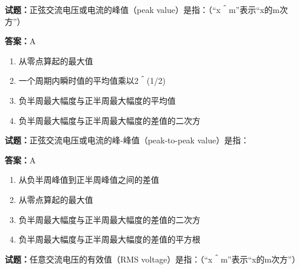 \documentclass{ctexbook}
\begin{document}





\vspace{1em}

\textbf{试题：}正弦交流电压或电流的峰值（peak value）是指：（“x＾m”表示“x的m次方”） 

\textbf{答案：}A 

\begin{enumerate}[leftmargin=3em]
  \item 从零点算起的最大值 

  \item 一个周期内瞬时值的平均值乘以2＾(1/2) 

  \item 负半周最大幅度与正半周最大幅度的平均值 

  \item 负半周最大幅度与正半周最大幅度的差值的二次方 

\end{enumerate}





\vspace{1em}

\textbf{试题：}正弦交流电压或电流的峰-峰值（peak-to-peak value）是指： 

\textbf{答案：}A 

\begin{enumerate}[leftmargin=3em]
  \item 从负半周峰值到正半周峰值之间的差值 

  \item 从零点算起的最大值 

  \item 负半周最大幅度与正半周最大幅度的差值的二次方 

  \item 负半周最大幅度与正半周最大幅度的差值的平方根 

\end{enumerate}





\vspace{1em}

\textbf{试题：}任意交流电压的有效值（RMS voltage）是指：（“x＾m”表示“x的m次方”） 
\end{document}
